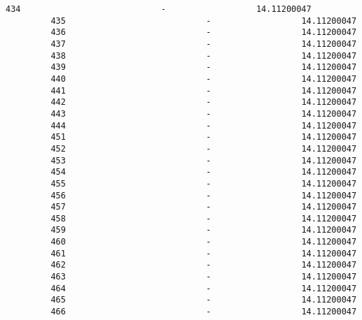 \documentclass[11pt]{article}
\begin{document}
\begin{Verbatim}[commandchars=\\\{\}]
         434                            -                  14.11200047   
         435                            -                  14.11200047   
         436                            -                  14.11200047   
         437                            -                  14.11200047   
         438                            -                  14.11200047   
         439                            -                  14.11200047   
         440                            -                  14.11200047   
         441                            -                  14.11200047   
         442                            -                  14.11200047   
         443                            -                  14.11200047   
         444                            -                  14.11200047   
         451                            -                  14.11200047   
         452                            -                  14.11200047   
         453                            -                  14.11200047   
         454                            -                  14.11200047   
         455                            -                  14.11200047   
         456                            -                  14.11200047   
         457                            -                  14.11200047   
         458                            -                  14.11200047   
         459                            -                  14.11200047   
         460                            -                  14.11200047   
         461                            -                  14.11200047   
         462                            -                  14.11200047   
         463                            -                  14.11200047   
         464                            -                  14.11200047   
         465                            -                  14.11200047   
         466                            -                  14.11200047   
         

\end{Verbatim}
\end{document}
